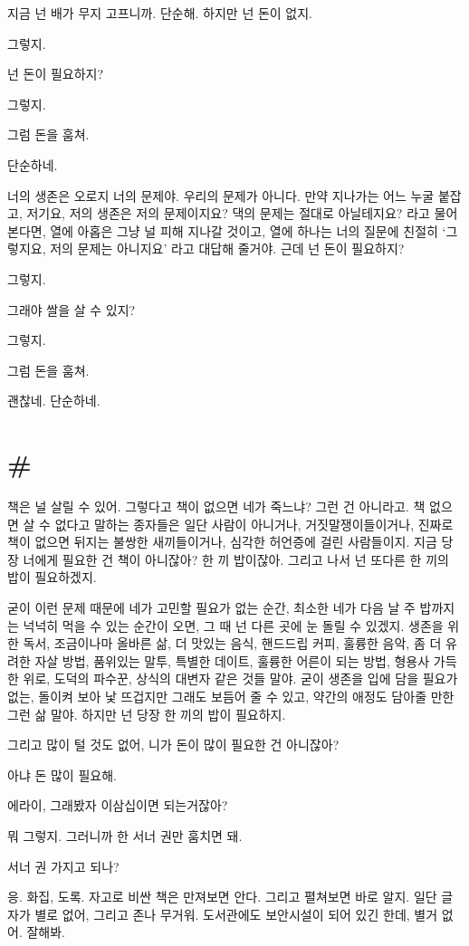 \documentclass[a5paper,10pt, twoside, openright]{memoir}
\begin{document}
	지금 넌 배가 무지 고프니까. 단순해. 하지만 넌 돈이 없지. 

	그렇지. 

	넌 돈이 필요하지? 

	그렇지. 

	그럼 돈을 훔쳐. 

	단순하네. 

	너의 생존은 오로지 너의 문제야. 우리의 문제가 아니다. 만약 지나가는 어느 누굴 붙잡고, 저기요, 저의 생존은 저의 문제이지요? 댁의 문제는 절대로 아닐테지요? 라고 물어본다면, 열에 아홉은 그냥 널 피해 지나갈 것이고, 열에 하나는 너의 질문에 친절히 ‘그렇지요, 저의 문제는 아니지요’ 라고 대답해 줄거야. 근데 넌 돈이 필요하지? 

	그렇지. 

	그래야 쌀을 살 수 있지? 

	그렇지. 

	그럼 돈을 훔쳐. 

	괜찮네. 단순하네. 

	\section{\#}
	책은 널 살릴 수 있어. 그렇다고 책이 없으면 네가 죽느냐? 그런 건 아니라고. 책 없으면 살 수 없다고 말하는 종자들은 일단 사람이 아니거나, 거짓말쟁이들이거나, 진짜로 책이 없으면 뒤지는 불쌍한 새끼들이거나, 심각한 허언증에 걸린 사람들이지. 지금 당장 너에게 필요한 건 책이 아니잖아? 한 끼 밥이잖아. 그리고 나서 넌 또다른 한 끼의 밥이 필요하겠지. 
	
	굳이 이런 문제 때문에 네가 고민할 필요가 없는 순간, 최소한 네가 다음 날 주 밥까지는 넉넉히 먹을 수 있는 순간이 오면, 그 때 넌 다른 곳에 눈 돌릴 수 있겠지. 생존을 위한 독서, 조금이나마 올바른 삶, 더 맛있는 음식, 핸드드립 커피, 훌륭한 음악, 좀 더 유려한 자살 방법, 품위있는 말투, 특별한 데이트, 훌륭한 어른이 되는 방법, 형용사 가득한 위로, 도덕의 파수꾼, 상식의 대변자 같은 것들 말야. 굳이 생존을 입에 담을 필요가 없는, 돌이켜 보아 낯 뜨겁지만 그래도 보듬어 줄 수 있고, 약간의 애정도 담아줄 만한 그런 삶 말야. 하지만 넌 당장 한 끼의 밥이 필요하지. 

	그리고 많이 털 것도 없어, 니가 돈이 많이 필요한 건 아니잖아? 

	아냐 돈 많이 필요해. 
	
	에라이, 그래봤자 이삼십이면 되는거잖아?
	
	뭐 그렇지. 그러니까 한 서너 권만 훔치면 돼.
	
	서너 권 가지고 되나? 

	응. 화집, 도록. 자고로 비싼 책은 만져보면 안다. 그리고 펼쳐보면 바로 알지. 일단 글자가 별로 없어, 그리고 존나 무거워. 도서관에도 보안시설이 되어 있긴 한데, 별거 없어. 잘해봐. 
	
\end{document}
